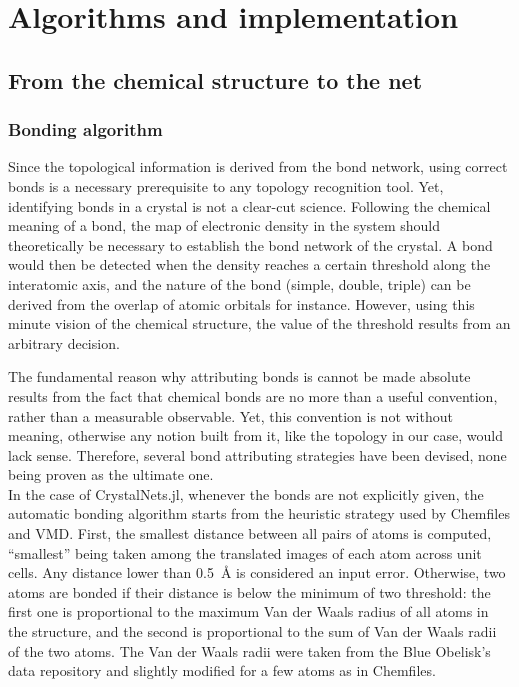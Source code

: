 \documentclass[main.tex]{subfiles}
\begin{document}
\section{Algorithms and implementation}

\subsection{From the chemical structure to the net}

\subsubsection{Bonding algorithm}
\label{bondingalgorithm}

Since the topological information is derived from the bond network, using correct bonds is a necessary prerequisite to any topology recognition tool. Yet, identifying bonds in a crystal is not a clear-cut science. %
Following the chemical meaning of a bond, the map of electronic density in the system should theoretically be necessary to establish the bond network of the crystal. A bond would then be detected when the density reaches a certain threshold along the interatomic axis, and the nature of the bond (simple, double, triple) can be derived from the overlap of atomic orbitals for instance. However, using this minute vision of the chemical structure, the value of the threshold results from an arbitrary decision.

The fundamental reason why attributing bonds is cannot be made absolute results from the fact that chemical bonds are no more than a useful convention, rather than a measurable observable. Yet, this convention is not without meaning, otherwise any notion built from it, like the topology in our case, would lack sense. Therefore, several bond attributing strategies have been devised, none being proven as the ultimate one. %
\\

In the case of CrystalNets.jl, whenever the bonds are not explicitly given, the automatic bonding algorithm starts from the heuristic strategy used by Chemfiles and VMD. First, the smallest distance between all pairs of atoms is computed, ``smallest'' being taken among the translated images of each atom across unit cells. Any distance lower than \qty{0.5}{\angstrom} is considered an input error. Otherwise, two atoms are bonded if their distance is below the minimum of two threshold: the first one is proportional to the maximum Van der Waals radius of all atoms in the structure, and the second is proportional to the sum of Van der Waals radii of the two atoms. The Van der Waals radii were taken from the Blue Obelisk's data repository and slightly modified for a few atoms as in Chemfiles.
\end{document}
